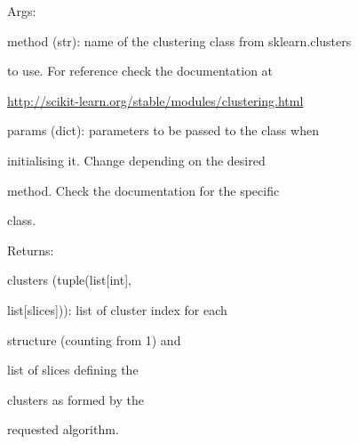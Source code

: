 \documentclass[letterpaper,10pt,english]{sphinxmanual}
\begin{document}
\begin{fulllineitems}
\begin{fulllineitems}
\begin{DUlineblock}{0em}
\item[] Args:
\item[]
\begin{DUlineblock}{\DUlineblockindent}
\item[] method (str): name of the clustering class from sklearn.clusters
\item[]
\begin{DUlineblock}{\DUlineblockindent}
\item[] to use. For reference check the documentation at
\item[] \url{http://scikit-learn.org/stable/modules/clustering.html}
\end{DUlineblock}
\item[] params (dict): parameters to be passed to the class when
\item[]
\begin{DUlineblock}{\DUlineblockindent}
\item[] initialising it. Change depending on the desired
\item[] method. Check the documentation for the specific
\item[] class.
\end{DUlineblock}
\end{DUlineblock}
\end{DUlineblock}

\begin{DUlineblock}{0em}
\item[] Returns:
\item[]
\begin{DUlineblock}{\DUlineblockindent}
\item[] clusters (tuple(list{[}int{]},
\item[]
\begin{DUlineblock}{\DUlineblockindent}
\item[] list{[}slices{]})): list of cluster index for each
\item[]
\begin{DUlineblock}{\DUlineblockindent}
\item[] structure (counting from 1) and
\item[] list of slices defining the
\item[] clusters as formed by the
\item[] requested algorithm.
\end{DUlineblock}
\end{DUlineblock}
\end{DUlineblock}
\end{DUlineblock}


\end{fulllineitems}
\end{fulllineitems}
\end{document}
